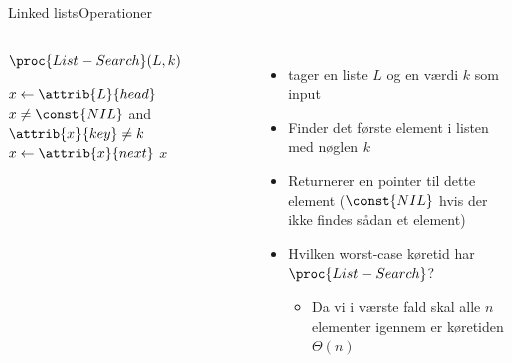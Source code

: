 \documentclass[aspectratio=1610]{beamer}
\begin{document}
\begin{frame}{Linked lists}{Operationer}
    \begin{columns}
        \small
        
        \begin{block}{$\proc{List-Search}(L,k)$}

            \vspace{-\abovedisplayskip}
            \begin{codebox}
                \li $x \gets \attrib{L}{head}$
                \li \While $x \neq \const{NIL}$ and $\attrib{x}{key} \neq k$
                    \Do
                \li     $x \gets \attrib{x}{next}$
                    \End
                \li \Return $x$
            \end{codebox}
        \end{block}


        \begin{itemize}[<+->]
            \item {} tager en liste $L$ og en værdi $k$ som
                input
            \item Finder det første element i listen med nøglen $k$
            \item Returnerer en pointer til dette element ($\const{NIL}$ hvis
                der ikke findes sådan et element)
            \item Hvilken worst-case køretid har $\proc{List-Search}$?
                \begin{itemize}
                    \item Da vi i værste fald skal alle $n$ elementer igennem er
                        køretiden $\Theta(n)$
                \end{itemize}
        \end{itemize}

    \end{columns}

\end{frame}
\end{document}
